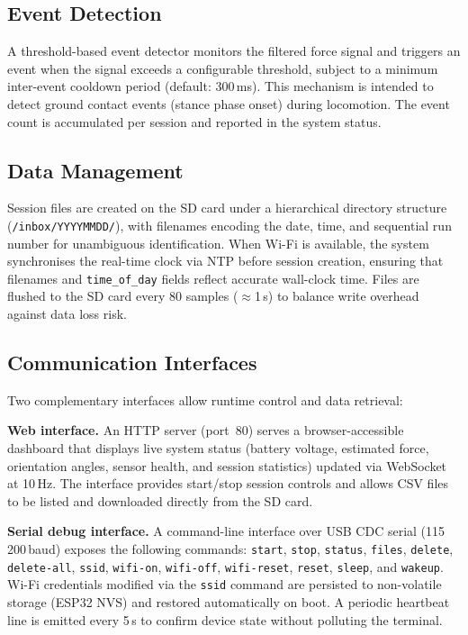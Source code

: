 \subsection{Event Detection}

A threshold-based event detector monitors the filtered force signal and
triggers an event when the signal exceeds a configurable threshold,
subject to a minimum inter-event cooldown period (default: 300\,ms).
This mechanism is intended to detect ground contact events (stance phase
onset) during locomotion.
The event count is accumulated per session and reported in the system status.

\subsection{Data Management}

Session files are created on the SD card under a hierarchical directory
structure (\texttt{/inbox/YYYYMMDD/}), with filenames encoding the
date, time, and sequential run number for unambiguous identification.
When Wi-Fi is available, the system synchronises the real-time clock
via NTP before session creation, ensuring that filenames and
\texttt{time\_of\_day} fields reflect accurate wall-clock time.
Files are flushed to the SD card every 80 samples ($\approx$1\,s)
to balance write overhead against data loss risk.

\subsection{Communication Interfaces}

Two complementary interfaces allow runtime control and data retrieval:

\textbf{Web interface.}
An HTTP server (port~80) serves a browser-accessible dashboard that
displays live system status (battery voltage, estimated force, orientation
angles, sensor health, and session statistics) updated via WebSocket at
10\,Hz.
The interface provides start/stop session controls and allows CSV files
to be listed and downloaded directly from the SD card.

\textbf{Serial debug interface.}
A command-line interface over USB CDC serial (115\,200\,baud) exposes
the following commands: \texttt{start}, \texttt{stop}, \texttt{status},
\texttt{files}, \texttt{delete}, \texttt{delete-all}, \texttt{ssid},
\texttt{wifi-on}, \texttt{wifi-off}, \texttt{wifi-reset},
\texttt{reset}, \texttt{sleep}, and \texttt{wakeup}.
Wi-Fi credentials modified via the \texttt{ssid} command are persisted
to non-volatile storage (ESP32 NVS) and restored automatically on boot.
A periodic heartbeat line is emitted every 5\,s to confirm device state
without polluting the terminal.

